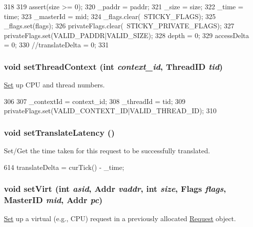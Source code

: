 \begin{DoxyCode}
318     {
319         assert(size >= 0);
320         _paddr = paddr;
321         _size = size;
322         _time = time;
323         _masterId = mid;
324         _flags.clear(~STICKY_FLAGS);
325         _flags.set(flags);
326         privateFlags.clear(~STICKY_PRIVATE_FLAGS);
327         privateFlags.set(VALID_PADDR|VALID_SIZE);
328         depth = 0;
329         accessDelta = 0;
330         //translateDelta = 0;
331     }
\end{DoxyCode}
\hypertarget{classRequest_a40574dadf22fb92b4966eb9815da7575}{
\subsubsection[{setThreadContext}]{\setlength{\rightskip}{0pt plus 5cm}void setThreadContext (int {\em context\_\-id}, \/  {\bf ThreadID} {\em tid})}}
\label{classRequest_a40574dadf22fb92b4966eb9815da7575}
\hyperlink{classSet}{Set} up CPU and thread numbers. 


\begin{DoxyCode}
306     {
307         _contextId = context_id;
308         _threadId = tid;
309         privateFlags.set(VALID_CONTEXT_ID|VALID_THREAD_ID);
310     }
\end{DoxyCode}
\hypertarget{classRequest_a619cef7b12397043980f12337b06492c}{
\subsubsection[{setTranslateLatency}]{\setlength{\rightskip}{0pt plus 5cm}void setTranslateLatency ()}}
\label{classRequest_a619cef7b12397043980f12337b06492c}
Set/Get the time taken for this request to be successfully translated. 


\begin{DoxyCode}
614 { translateDelta = curTick() - _time; }
\end{DoxyCode}
\hypertarget{classRequest_a63cbf386080363fe7c7b364bb2fe3b3e}{
\subsubsection[{setVirt}]{\setlength{\rightskip}{0pt plus 5cm}void setVirt (int {\em asid}, \/  {\bf Addr} {\em vaddr}, \/  int {\em size}, \/  {\bf Flags} {\em flags}, \/  {\bf MasterID} {\em mid}, \/  {\bf Addr} {\em pc})}}
\label{classRequest_a63cbf386080363fe7c7b364bb2fe3b3e}
\hyperlink{classSet}{Set} up a virtual (e.g., CPU) request in a previously allocated \hyperlink{classRequest}{Request} object. 


